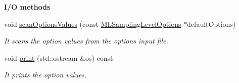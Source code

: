 \begin{Indent}{\bf I/\-O methods}\par
\begin{DoxyCompactItemize}
\item 
void \hyperlink{class_q_u_e_s_o_1_1_m_l_sampling_level_options_a43eab3a27bdd011e3deb0f5544d8d2d1}{scan\-Options\-Values} (const \hyperlink{class_q_u_e_s_o_1_1_m_l_sampling_level_options}{M\-L\-Sampling\-Level\-Options} $\ast$default\-Options)
\begin{DoxyCompactList}\small\item\em It scans the option values from the options input file. \end{DoxyCompactList}\item 
void \hyperlink{class_q_u_e_s_o_1_1_m_l_sampling_level_options_aa93cbeb67047e0a606b8cdfe0047eebe}{print} (std\-::ostream \&os) const 
\begin{DoxyCompactList}\small\item\em It prints the option values. \end{DoxyCompactList}\end{DoxyCompactItemize}
\end{Indent}

